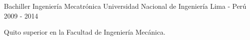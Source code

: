 

\begin{cventries}

  \cventry
    {Bachiller Ingenier\'ia Mecatr\'onica} %
    {Universidad Nacional de Ingenier\'ia} %
    {Lima - Per\'u} %
    {2009 - 2014} %
    {
      \begin{cvitems} %
        \item {Quito superior en la Facultad de Ingenier\'ia Mec\'anica.}
      \end{cvitems}
    }

\end{cventries}
